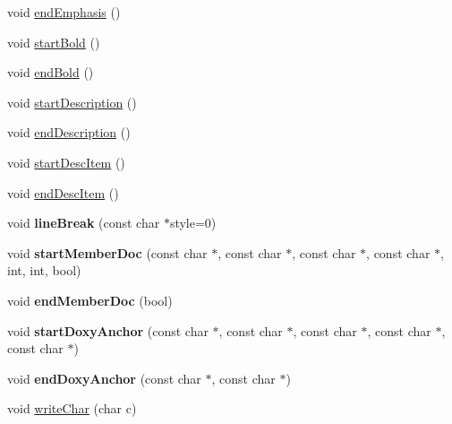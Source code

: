\begin{DoxyCompactItemize}
void \mbox{\hyperlink{class_latex_generator_a5837f5169fd6b05b088a4d9182756711}{end\+Emphasis}} ()
\item 
void \mbox{\hyperlink{class_latex_generator_a48859c667b43515483f4adb04f46cf0e}{start\+Bold}} ()
\item 
void \mbox{\hyperlink{class_latex_generator_ae2336bd8bc8ca0802fb94ff6953e7779}{end\+Bold}} ()
\item 
void \mbox{\hyperlink{class_latex_generator_a32a518fb74711bc0e791c03e95c666cb}{start\+Description}} ()
\item 
void \mbox{\hyperlink{class_latex_generator_a3da64ef2d6cfe58facd7a35ad736ea83}{end\+Description}} ()
\item 
void \mbox{\hyperlink{class_latex_generator_a92603047f2bff0fef3c2bd5ed1be73d9}{start\+Desc\+Item}} ()
\item 
void \mbox{\hyperlink{class_latex_generator_aa675b530ccd61f9c4784efc2abcedbaa}{end\+Desc\+Item}} ()
\item 
\mbox{\label{class_latex_generator_a91b269c8334ab9dffaf5d07d4c34ae69}} 
void {\bfseries line\+Break} (const char $\ast$style=0)
\item 
\mbox{\label{class_latex_generator_a5a514eb7bf6b73fa51afaa928d232a16}} 
void {\bfseries start\+Member\+Doc} (const char $\ast$, const char $\ast$, const char $\ast$, const char $\ast$, int, int, bool)
\item 
\mbox{\label{class_latex_generator_a51b9aabafad0c3536c40033e4a200e58}} 
void {\bfseries end\+Member\+Doc} (bool)
\item 
\mbox{\label{class_latex_generator_a9150e3ed0cc728e11d3d73f7d1965a81}} 
void {\bfseries start\+Doxy\+Anchor} (const char $\ast$, const char $\ast$, const char $\ast$, const char $\ast$, const char $\ast$)
\item 
\mbox{\label{class_latex_generator_a559ff209839486737e1fe0bea3badd1f}} 
void {\bfseries end\+Doxy\+Anchor} (const char $\ast$, const char $\ast$)
\item 
void \mbox{\hyperlink{class_latex_generator_a910e0329c0a8c8b54685d2335d22f690}{write\+Char}} (char c)
\item 
\mbox{\label{class_latex_generator_a9ca2b0c10ac902436350642079fbd56b}} 

\end{DoxyCompactItemize}
